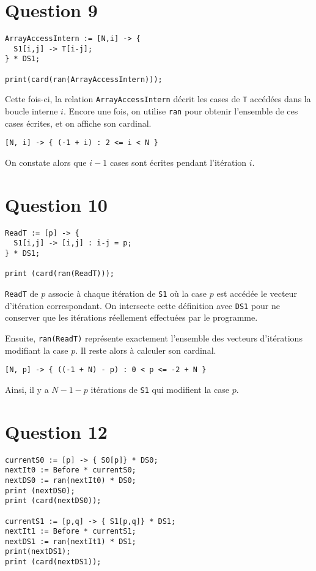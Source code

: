 \documentclass{article}
\begin{document}
\section*{Question 9}

\begin{lstlisting}
ArrayAccessIntern := [N,i] -> {
  S1[i,j] -> T[i-j];
} * DS1;

print(card(ran(ArrayAccessIntern)));
\end{lstlisting}

Cette fois-ci, la relation \lstinline{ArrayAccessIntern} décrit les cases de \lstinline{T} accédées dans la boucle interne $i$.
Encore une fois, on utilise \lstinline{ran} pour obtenir l'ensemble de ces cases écrites, et on affiche son cardinal.

\begin{lstlisting}
[N, i] -> { (-1 + i) : 2 <= i < N }
\end{lstlisting}

On constate alors que $i-1$ cases sont écrites pendant l'itération $i$.

\section*{Question 10}

\begin{lstlisting}
ReadT := [p] -> {
  S1[i,j] -> [i,j] : i-j = p;
} * DS1;

print (card(ran(ReadT)));
\end{lstlisting}

\lstinline{ReadT} de $p$ associe à chaque itération de \lstinline{S1} où la case $p$ est accédée le vecteur d'itération correspondant.
On intersecte cette définition avec \lstinline{DS1} pour ne conserver que les itérations réellement effectuées par le programme.

Ensuite, \lstinline{ran(ReadT)} représente exactement l'ensemble des vecteurs d'itérations modifiant la case $p$. Il reste alors à calculer son cardinal.

\begin{lstlisting}
[N, p] -> { ((-1 + N) - p) : 0 < p <= -2 + N }
\end{lstlisting}

Ainsi, il y a $N-1-p$ itérations de \lstinline{S1} qui modifient la case $p$.

\section*{Question 12}
\begin{lstlisting}
currentS0 := [p] -> { S0[p]} * DS0;
nextIt0 := Before * currentS0;
nextDS0 := ran(nextIt0) * DS0;
print (nextDS0);
print (card(nextDS0));

currentS1 := [p,q] -> { S1[p,q]} * DS1;
nextIt1 := Before * currentS1;
nextDS1 := ran(nextIt1) * DS1;
print(nextDS1);
print (card(nextDS1));
\end{lstlisting}
\end{document}
